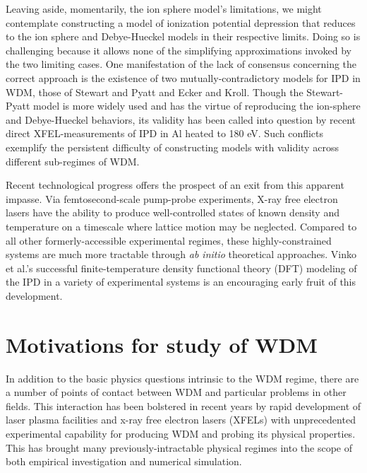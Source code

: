 \documentclass [11pt, proquest, article] {uwthesis}[2016/11/22]
\begin{document}

Leaving aside, momentarily, the ion sphere model's limitations, we might contemplate constructing a model of ionization potential depression that reduces to the ion sphere and Debye-Hueckel models in their respective limits. Doing so is challenging because it allows none of the simplifying approximations invoked by the two limiting cases. One manifestation of the lack of consensus concerning the correct approach is the existence of two mutually-contradictory models for IPD in WDM, those of Stewart and Pyatt \cite{stewart1966lowering} and Ecker and Kroll. \cite{ecker1963lowering} Though the Stewart-Pyatt model is more widely used and has the virtue of reproducing the ion-sphere and Debye-Hueckel behaviors, its validity has been called into question by recent direct XFEL-measurements of IPD in Al heated to 180 eV. \cite{ciricosta2012direct, crowley2014continuum} Such conflicts exemplify the persistent difficulty of constructing models with validity across different sub-regimes of WDM.

Recent technological progress offers the prospect of an exit from this apparent impasse. Via femtosecond-scale pump-probe experiments, X-ray free electron lasers have the ability to produce well-controlled states of known density and temperature on a timescale where lattice motion may be neglected. Compared to all other formerly-accessible experimental regimes, these highly-constrained systems are much more tractable through \emph{ab initio} theoretical approaches. Vinko et al.'s successful finite-temperature density functional theory (DFT) modeling of the IPD in a variety of experimental systems is an encouraging early fruit of this development.\cite{vinko2014density}


\section{Motivations for study of WDM}
In addition to the basic physics questions intrinsic to the WDM regime, there are a number of points of contact between WDM and particular problems in other fields. This interaction has been bolstered in recent years by rapid development of laser plasma facilities and x-ray free electron lasers (XFELs) with unprecedented experimental capability for producing WDM and probing its physical properties. This has brought many previously-intractable physical regimes into the scope of both empirical investigation and numerical simulation.  
\end{document}
